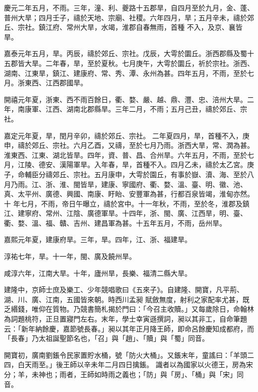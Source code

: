 \begin{pinyinscope}
 慶元二年五月，不雨。三年，潼、利、夔路十五郡旱，自四月至於九月，金、蓬、普州大旱；四月壬子，禱於天地、宗廟、社稷。六年四月，旱；五月辛未，禱於郊丘、宗社。鎮江府、常州大旱，水竭，淮郡自春無雨，首種
 不入，及京、襄皆旱。



 嘉泰元年五月，旱。丙辰，禱於郊丘、宗社。戊辰，大雩於圜丘。浙西郡縣及蜀十五郡皆大旱。二年春，旱，至於夏秋。七月庚午，大雩於圜丘，祈於宗社。浙西、湖南、江東旱，鎮江、建康府、常、秀、潭、永州為甚。四年五月，不雨，至於七月。浙東西、江西郡國旱。



 開禧元年夏，浙東、西不雨百餘日，衢、婺、嚴、越、鼎、灃、忠、涪州大旱。二年，南康軍、江西、湖南北郡縣旱。三年二月，不雨；五月己丑，禱於郊丘、宗社。



 嘉定元年夏，旱，閏月辛卯，禱於郊丘、宗社。
 二年夏四月，旱，首種不入，庚申，禱於郊丘、宗社。六月乙酉，又禱，至於七月乃雨。浙西大旱，常、潤為甚。淮東西、江東、湖北皆旱。四年，資、普、昌、合州旱。六年五月，不雨，至於七月，江陵、德安、漢陽軍旱。入年春，旱，首種不入。四月乙未，禱於太乙宮。庚子，命輔臣分禱郊丘、宗社。五月康申，大雩於園丘，有事於嶽、瀆、海、至於八月乃雨。江、浙、淮、閩皆旱，建康、寧國府、衢、婺、溫、臺、明、徽、池、真、太平州、廣德、興國、南康、盱眙、安豐軍為甚，行都百泉皆竭，淮甸亦然。十
 年七月，不雨，帝日午曝立，禱於宮中。十一年秋，不雨，至於冬，淮郡及鎮江、建寧府、常州、江陰、廣德軍旱。十四年，浙、閩、廣、江西旱，明、臺、衢、婺、溫、福、贛、吉州、建昌軍為甚。十五年五月，不雨，岳州旱。



 嘉熙元年夏，建康府旱。三年，旱。四年，江、浙、福建旱。



 淳祐七年，旱。十一年，閩、廣及饒州旱。



 咸淳六年，江南大旱。十年，廬州旱，長樂、福清二縣大旱。



 建隆中，京師士庶及樂工、少年競唱歌曰《五來子》。自建隆、開寶，凡平荊、湖、川、廣、江南，五國皆來朝。時西川孟昶
 賦斂無度，射利之家配率尤甚，既乏緡錢，唯仰在質物。乃競書簡札揭於門曰：「今召主收贖。」又每歲除日，命翰林為詞題桃符，正旦置寢門左右。末年，學士幸寅遜撰詞，昶以其非工，自命筆題云：「新年納餘慶，嘉節號長春。」昶以其年正月降王師，即命呂餘慶知成都府，而「長春」乃太祖誕聖節名也，「召」與「趙」、「贖」與「蜀」同音。



 開寶初，廣南劉鋹令民家置貯水桶，號「防火大桶」。又鋹末年，童謠曰：「羊頭二四，白天雨至。」後王師以辛未年二月四日擒鋹。
 識者以為國家以火德王，房為宋分；羊，未神也；雨者，王師如時雨之義也；「防」與「房」、「桶」與「宋」同音。




\end{pinyinscope}
